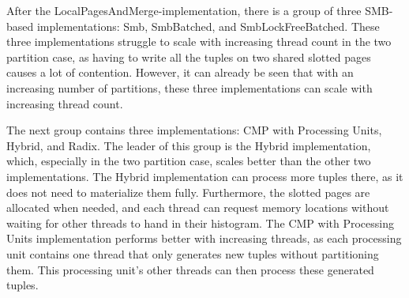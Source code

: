 After the LocalPagesAndMerge-implementation, there is a group of three \acf{SMB}-based implementations: Smb, SmbBatched, and SmbLockFreeBatched.
These three implementations struggle to scale with increasing thread count in the two partition case, as having to write all the tuples on two shared slotted pages causes a lot of contention.
However, it can already be seen that with an increasing number of partitions, these three implementations can scale with increasing thread count.

The next group contains three implementations: \acf{CMP} with Processing Units, Hybrid, and Radix.
The leader of this group is the Hybrid implementation, which, especially in the two partition case, scales better than the other two implementations.
The Hybrid implementation can process more tuples there, as it does not need to materialize them fully.
Furthermore, the slotted pages are allocated when needed, and each thread can request memory locations without waiting for other threads to hand in their histogram.
The \ac{CMP} with Processing Units implementation performs better with increasing threads, as each processing unit contains one thread that only generates new tuples without partitioning them.
This processing unit's other threads can then process these generated tuples.

